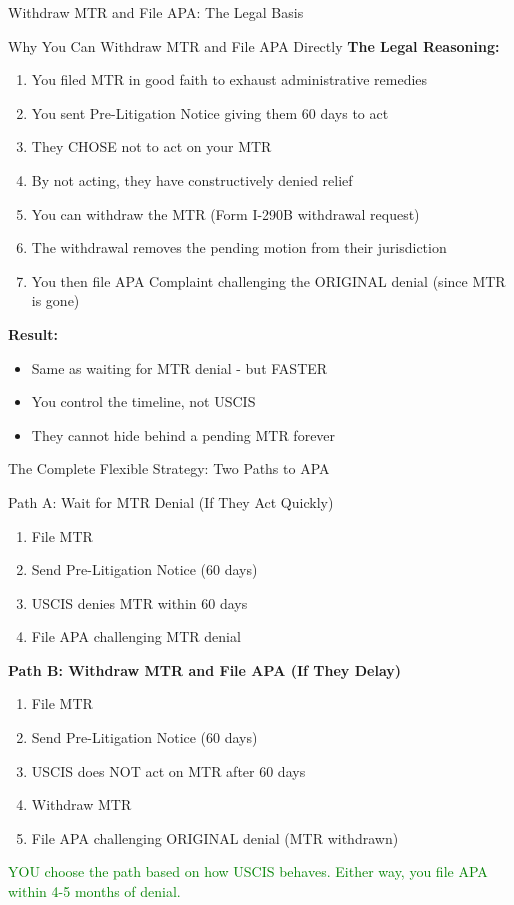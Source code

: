 \documentclass[11pt]{beamer}
\begin{document}
	\begin{frame}{Withdraw MTR and File APA: The Legal Basis}
		\scriptsize
		\begin{block}{Why You Can Withdraw MTR and File APA Directly}
			\textbf{The Legal Reasoning:}
			\vspace{0.2cm}
			\begin{enumerate}
				\item You filed MTR in good faith to exhaust administrative remedies
				\item You sent Pre-Litigation Notice giving them 60 days to act
				\item They CHOSE not to act on your MTR
				\item By not acting, they have constructively denied relief
				\item You can withdraw the MTR (Form I-290B withdrawal request)
				\item The withdrawal removes the pending motion from their jurisdiction
				\item You then file APA Complaint challenging the ORIGINAL denial (since MTR is gone)
			\end{enumerate}
			\textbf{Result:}
			\begin{itemize}
				\item Same as waiting for MTR denial - but FASTER
				\item You control the timeline, not USCIS
				\item They cannot hide behind a pending MTR forever
			\end{itemize}
		\end{block}
	\end{frame}
	
	\begin{frame}{The Complete Flexible Strategy: Two Paths to APA}
		\scriptsize
		\begin{block}{Path A: Wait for MTR Denial (If They Act Quickly)}
			\begin{enumerate}
				\item File MTR
				\item Send Pre-Litigation Notice (60 days)
				\item USCIS denies MTR within 60 days
				\item File APA challenging MTR denial
			\end{enumerate}
			\textbf{Path B: Withdraw MTR and File APA (If They Delay)}
			\begin{enumerate}
				\item File MTR
				\item Send Pre-Litigation Notice (60 days)
				\item USCIS does NOT act on MTR after 60 days
				\item Withdraw MTR
				\item File APA challenging ORIGINAL denial (MTR withdrawn)
			\end{enumerate}
			\textcolor{green}{YOU choose the path based on how USCIS behaves.}
			\textcolor{green}{Either way, you file APA within 4-5 months of denial.}
		\end{block}
	\end{frame}
	
\end{document}
